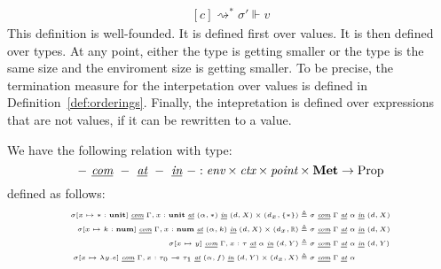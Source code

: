 \begin{definition}
\begin{equation}
\begin{aligned}[c]
{    \rightsquigarrow^* \sigma' \Vdash v}
  \end{aligned}
  \end{equation}
  This definition is well-founded. It is defined first over values. It is then
  defined over types. At any point, either the type is getting smaller or the
  type is the same size and the enviroment size is getting smaller. To be
  precise, the termination measure for the interpetation over values is defined
  in Definition~\ref{def:orderings}. Finally, the intepretation is defined over
  expressions that are not values, if it can be rewritten to a value.
\end{definition}

\begin{definition}
  We have the following relation with type:
  $$- \textit{ \underline{com} } - \textit{ \underline{at} } -
  \textit{ \underline{in} } - : \textit{env} \times
  \textit{ctx} \times \textit{point} \times \textbf{Met} \to \text{Prop}$$ 
  defined as follows:
  \begin{equation}
    \begin{tiny}
    \begin{aligned}[c] 
      \sigma[x \mapsto * : \textbf{unit}] \textit{ \underline{com} } \Gamma, x: \textbf{unit} \textit{ \underline{at} } (\alpha, *) \textit{ \underline{in} } (d, X) \times (d_x, \{ * \}) &\triangleq 
      \sigma \textit{ \underline{com} } \Gamma \textit{ \underline{at} } \alpha \textit{ \underline{in} } (d, X)\\
      \sigma[x \mapsto k : \textbf{num}] \textit{ \underline{com} } \Gamma, x: \textbf{num} \textit{ \underline{at} } (\alpha, k) \textit{ \underline{in} } (d, X) \times (d_x, \mathbb{R}) &\triangleq 
      \sigma \textit{ \underline{com} } \Gamma \textit{ \underline{at} } \alpha \textit{ \underline{in} } (d, X) \\
      \sigma[x \mapsto y] \textit{ \underline{com} } \Gamma, x :
      \tau \textit{ \underline{at} } \alpha \textit{
        \underline{in} } (d, Y) &\triangleq \sigma \textit{
        \underline{com} } \Gamma \textit{ \underline{at} } \alpha \textit{
        \underline{in} } (d, Y) \\
      \sigma[x \mapsto \lambda y . e] \textit{ \underline{com} } \Gamma, x :
      \tau_0 \multimap \tau_1 \textit{ \underline{at} } (\alpha, f) \textit{
        \underline{in} } (d, Y) \times (d_x, X) &\triangleq \sigma \textit{
        \underline{com} } \Gamma \textit{ \underline{at} } \alpha \textit{
}
\end{aligned}
\end{tiny}
\end{equation}
\end{definition}
